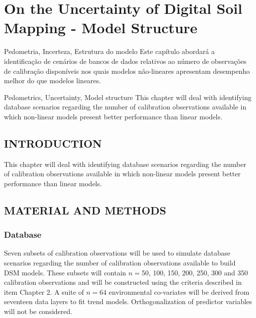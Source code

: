 \artigotrue
\chapter{On the Uncertainty of Digital Soil Mapping - Model Structure}
\label{chap:chapter05}

\begin{chapterabstractPOR}{Pedometria, Incerteza, Estrutura do modelo}
Este capítulo abordará a identificação de cenários de bancos de dados relativos ao número de observações de calibração disponíveis nos quais modelos não-lineares apresentam desempenho melhor do que modelos lineares.
\end{chapterabstractPOR}

\begin{chapterabstractENG}{Pedometrics, Uncertainty, Model structure}
This chapter will deal with identifying database scenarios regarding the number of calibration observations available in which non-linear models present better performance than linear models.
\end{chapterabstractENG}

\section{INTRODUCTION}

This chapter will deal with identifying database scenarios regarding the number of calibration observations available in which non-linear models present better performance than linear models.

\section{MATERIAL AND METHODS}

\subsection{Database}

Seven subsets of calibration observations will be used to simulate database scenarios regarding the number of calibration observations available to build DSM models. These subsets will contain $n=$50, 100, 150, 200, 250, 300 and 350 calibration observations and will be constructed using the criteria described in item Chapter 2. A suite of $n=64$ environmental co-variates will be derived from seventeen data layers to fit trend models. Orthogonalization of predictor variables will not be considered.

